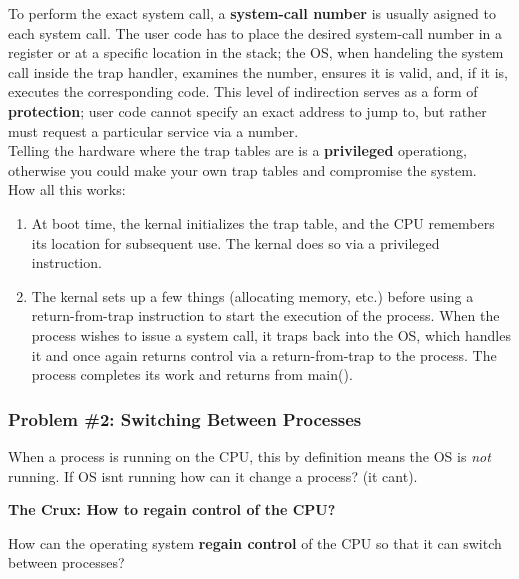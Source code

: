 To perform the exact system call, a \textbf{system-call number} is usually 
asigned to each system call. The user code has to place the desired system-call
number in a register or at a specific location in the stack; the OS, when
handeling the system call inside the trap handler, examines the number,
ensures it is valid, and, if it is, executes the corresponding code. This
level of indirection serves as a form of \textbf{protection}; user code cannot
specify an exact address to jump to, but rather must request a particular 
service via a number.\\

Telling the hardware where the trap tables are is a \textbf{privileged} 
operationg, otherwise you could make your own trap tables and compromise the
system.\\

How all this works:

\begin{enumerate}
    \item At boot time, the kernal initializes the trap table, and the CPU
        remembers its location for subsequent use. The kernal does so via
        a privileged instruction.
    \item The kernal sets up a few things (allocating memory, etc.) before
        using a return-from-trap instruction to start the execution of the 
        process. When the process wishes to issue a system call, it traps back
        into the OS, which handles it and once again returns control via a 
        return-from-trap to the process. The process completes its work and 
        returns from main().
\end{enumerate}

\subsubsection{Problem \#2: Switching Between Processes}

When a process is running on the CPU, this by definition means the OS is
\textit{not} running. If OS isnt running how can
it change a process? (it cant).\\

\begin{tcolorbox}
    \textbf{The Crux: How to regain control of the CPU?}

    How can the operating system \textbf{regain control} of the CPU so that it can
    switch between processes?
\end{tcolorbox}

